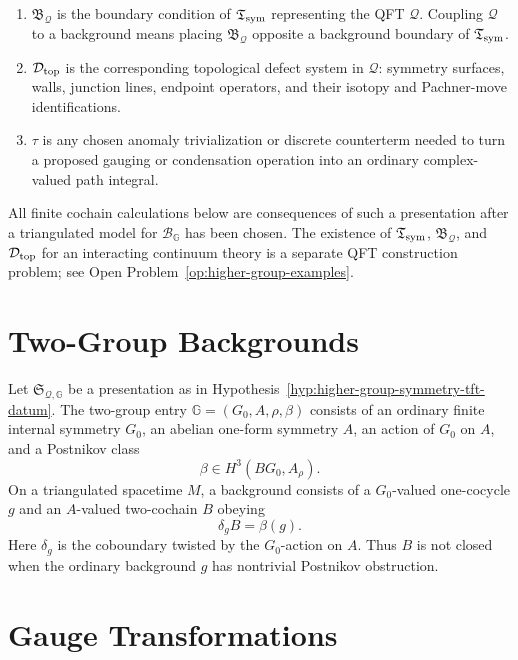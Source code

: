 \begin{hypothesis}
\begin{enumerate}[label=\textnormal{(\roman*)}]
  whose bulk fields are the \(\mathbb G\)-backgrounds and whose boundary
  conditions include background-fixing and summing/gauging boundaries.
\item \(\mathfrak B_{\mathcal Q}\) is the boundary condition of
  \(\mathfrak T_{\rm sym}\) representing the QFT \(\mathcal Q\).  Coupling
  \(\mathcal Q\) to a background means placing \(\mathfrak B_{\mathcal Q}\)
  opposite a background boundary of \(\mathfrak T_{\rm sym}\).
\item \(\mathcal D_{\rm top}\) is the corresponding topological defect system
  in \(\mathcal Q\): symmetry surfaces, walls, junction lines, endpoint
  operators, and their isotopy and Pachner-move identifications.
\item \(\tau\) is any chosen anomaly trivialization or discrete counterterm
  needed to turn a proposed gauging or condensation operation into an ordinary
  complex-valued path integral.
\end{enumerate}
All finite cochain calculations below are consequences of such a presentation
after a triangulated model for \(\mathcal B_{\mathbb G}\) has been chosen.  The
existence of \(\mathfrak T_{\rm sym}\), \(\mathfrak B_{\mathcal Q}\), and
\(\mathcal D_{\rm top}\) for an interacting continuum theory is a separate QFT
construction problem; see
Open Problem~\ref{op:higher-group-examples}.
\end{hypothesis}

\section{Two-Group Backgrounds}

Let \(\mathfrak S_{\mathcal Q,\mathbb G}\) be a presentation as in
Hypothesis~\ref{hyp:higher-group-symmetry-tft-datum}.  The two-group entry
\(\mathbb G=(G_0,A,\rho,\beta)\) consists of an ordinary finite internal
symmetry \(G_0\), an abelian one-form symmetry \(A\), an action of \(G_0\) on
\(A\), and a Postnikov class
\[
  \beta\in H^3(BG_0,A_\rho).
\]
On a triangulated spacetime \(M\), a background consists of a \(G_0\)-valued
one-cocycle \(g\) and an \(A\)-valued two-cochain \(B\) obeying
\[
  \delta_g B=\beta(g).
\]
Here \(\delta_g\) is the coboundary twisted by the \(G_0\)-action on \(A\).
Thus \(B\) is not closed when the ordinary background \(g\) has nontrivial
Postnikov obstruction.

\section{Gauge Transformations}

